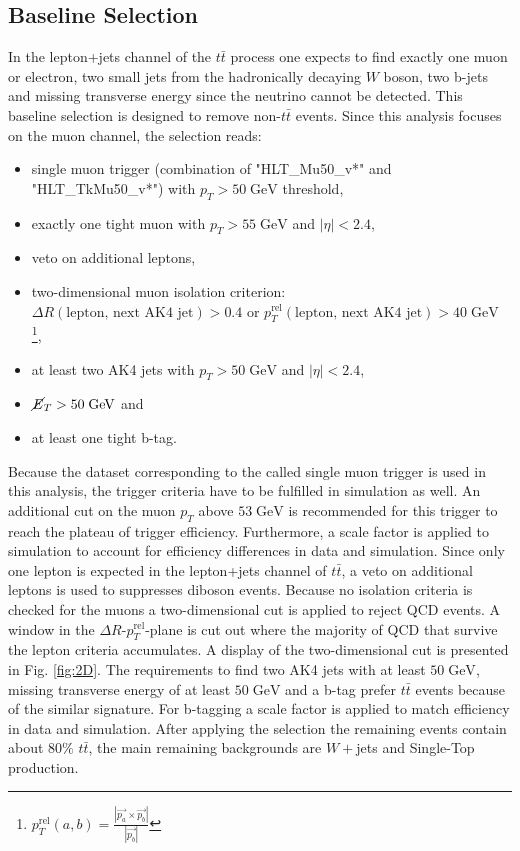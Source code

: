 \subsection{Baseline Selection}
\label{sec:PreSel}
	In the lepton+jets channel of the $t\bar{t}$ process one expects to find exactly one muon or electron, two small jets from the hadronically decaying $W$ boson, two b-jets and missing transverse energy since the neutrino cannot be detected. This baseline selection is designed to remove non-$t\bar{t}$ events. Since this analysis focuses on the muon channel, the selection reads:
	\begin{itemize}
	\item single muon trigger (combination of "HLT\_Mu50\_v*" and "HLT\_TkMu50\_v*") with $p_T > 50\;\text{GeV}$ threshold,
	\item exactly one tight muon with $p_T > 55\;\text{GeV}$ and $|\eta| < 2.4$,
	\item veto on additional leptons,
	\item two-dimensional muon isolation criterion: \\ $\Delta R(\text{lepton, next AK4 jet}) > 0.4$ or $p_T^{\text{rel}}(\text{lepton, next AK4 jet}) > 40\;\text{GeV}$ \footnote{$p_T^{\text{rel}}(a,b) = \frac{|\vec{p_a} \times \vec{p_b}|}{|\vec{p_b}|}$},
	\item at least two AK4 jets with $p_T > 50\;\text{GeV}$ and $|\eta| < 2.4$,
	\item $\cancel{E}_T > 50\;\text{GeV}$ and
	\item at least one tight b-tag.

	\end{itemize}
	Because the dataset corresponding to the called single muon trigger is used in this analysis, the trigger criteria have to be fulfilled in simulation as well. An additional cut on the muon $p_T$ above $53\;\text{GeV}$ is recommended \cite{MuonID} for this trigger to reach the plateau of trigger efficiency. Furthermore, a scale factor is applied to simulation to account for efficiency differences in data and simulation. Since only one lepton is expected in the lepton+jets channel of $t\bar{t}$, a veto on additional leptons is used to suppresses diboson events. Because no isolation criteria is checked for the muons a two-dimensional cut is applied to reject QCD events. A window in the $\Delta R$-$p_T^{\text{rel}}$-plane is cut out where the majority of QCD that survive the lepton criteria accumulates. A display of the two-dimensional cut is presented in Fig. \ref{fig:2D}. The requirements to find two AK4 jets with at least $50\;\text{GeV}$, missing transverse energy of at least $50\;\text{GeV}$ and a b-tag prefer $t\bar{t}$ events because of the similar signature. For b-tagging a scale factor is applied to match efficiency in data and simulation. After applying the selection the remaining events contain about $80\%$ $t\bar{t}$, the main remaining backgrounds are $W+$jets and Single-Top production. 
